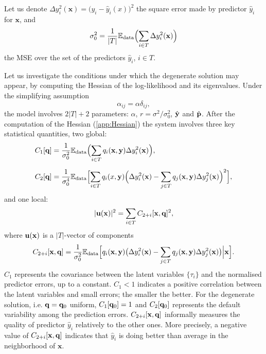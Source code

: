 Let us denote $\Delta y_i^2(\mathbf{x})= \bigl(y_i-\hat y_i(x)\bigr)^2$ the square error made by predictor 
$\hat y_i$ for $\mathbf{x}$, and 
\[
  \sigma_0^2 = \frac{1}{|T|}{\mathbb E}_{\rm data}\Bigl(\sum_{i \in T } \Delta y_i^2(\mathbf{x})\Bigr)
\]
the MSE over the set of the predictors $\hat y_i$, $i \in T$. 

Let us investigate the conditions under which the degenerate solution may appear, by computing the 
Hessian of the log-likelihood and its eigenvalues. Under the simplifying assumption
\[
  \alpha_{ij} = \alpha \delta_{ij},
\]
the model involves $2\vert T\vert+2$ parameters: $\alpha$, $r = \sigma^2/\sigma_0^2$, 
$\hat {\bf y}$ and $\hat{\bf p}$. After the computation of the Hessian (\cref{app:Hessian}) the system 
involves three key statistical quantities, two global:
%
\begin{align}
  C_1[{\bf q}] &= \frac{1}{\sigma_0^2}{
    \mathbb E}_{\rm data}
      \Bigl(
        \sum_{i \in T} q_i(\mathbf{x},{\bf y})\Delta y_i^2(\mathbf{x})
      \Bigr), \label{def:C1}\\[0.2cm]
  C_2[{\bf q}] &= \frac{1}{\sigma_0^4} {\mathbb E}_{\rm data} 
    \Bigl[\sum_{i\in T}q_i(x,{\bf y})
      \Bigl(
        \Delta y_i^2(\mathbf{x})-\sum_{j \in T} q_j(\mathbf{x},{\bf y})\Delta y_j^2(\mathbf{x})
      \Bigr)^2
    \Bigr],\label{def:C2}
\end{align}
%
and one local:
\begin{equation}
  \vert {\bf u}(\mathbf{x})\vert^2 = \sum_{i\in T} C_{2+i}[\mathbf{x},{\bf q}]^2,
\end{equation}
%
where ${\bf u}(\mathbf{x})$ is a $\vert T\vert$-vector of components 
%
\[
  C_{2+i}[\mathbf{x},{\bf q}] = \frac{1}{\sigma_0^2}{\mathbb E}_{\rm data}
    \Bigl[ q_i(\mathbf{x},{\bf y})
      \bigl(
        \Delta y_i^2(\mathbf{x})-\sum_{j \in T} q_j(\mathbf{x},{\bf y})\Delta y_j^2(\mathbf{x})
      \bigr)\Big\vert \mathbf{x} 
    \Bigr].
\]
%
$C_1$ represents the covariance between the latent variables $\{\tau_i\}$ and the normalised 
predictor errors, up to a constant. $C_1 < 1$ indicates a positive correlation between the latent 
variables and small errors; the smaller the better. For the degenerate solution, i.e. 
${\bf q}={\bf q}_{0}$ uniform, $C_1[{\bf q}_{0}]=1$ and $C_2[{\bf q}_{0}]$ represents the default variability among the 
prediction errors. $C_{2+i}[\mathbf{x},{\bf q}]$ informally measures the quality of predictor $\hat y_i$ 
relatively to the other ones. More precisely, a negative value of  $C_{2+i}[\mathbf{x},{\bf q}]$ indicates 
that $\hat y_i$ is doing better than average in the neighborhood of $\mathbf{x}$.  
